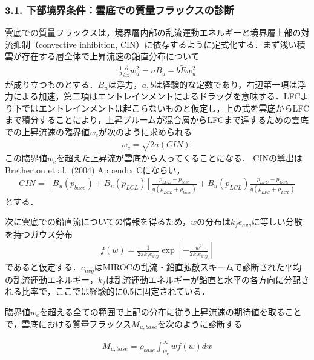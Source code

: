 \hypertarget{ux4e0bux90e8ux5883ux754cux6761ux4ef6ux96f2ux5e95ux3067ux306eux8ceaux91cfux30d5ux30e9ux30c3ux30afux30b9ux306eux8a3aux65ad}{%
\subsubsection{3.1.
下部境界条件：雲底での質量フラックスの診断}\label{ux4e0bux90e8ux5883ux754cux6761ux4ef6ux96f2ux5e95ux3067ux306eux8ceaux91cfux30d5ux30e9ux30c3ux30afux30b9ux306eux8a3aux65ad}}

雲底での質量フラックスは，境界層内部の乱流運動エネルギーと境界層上部の対流抑制（convective
inhibition,
CIN）に依存するように定式化する．まず浅い積雲が存在する層全体で上昇流速の鉛直分布について
\begin{eqnarray}\frac{1}{2}\frac{\partial}{\partial z}w_u^2=aB_u-b\tilde{E} w_u^2\end{eqnarray}
が成り立つものとする．\(B_u\)は浮力，\(a,b\)は経験的な定数であり，右辺第一項は浮力による加速，第二項はエントレインメントによるドラッグを意味する．LFCより下ではエントレインメントは起こらないものと仮定し，上の式を雲底からLFCまで積分することにより，上昇プルームが混合層からLFCまで達するための雲底での上昇流速の臨界値\(w_c\)が次のように求められる
\begin{eqnarray}w_c = \sqrt{2a(CIN)}.\end{eqnarray}
この臨界値\(w_c\)を超えた上昇流が雲底から入ってくることになる．
CINの導出はBretherton et al.~(2004) Appendix Cにならい，
\begin{eqnarray}CIN = [B_u(p_{base}) + B_u(p_{LCL})]\frac{p_{LCL}-p_{base}}{g(\rho_{LCL}+\rho_{base})} + B_u(p_{LCL})\frac{p_{LFC}-p_{LCL}}{g(\rho_{LFC}+\rho_{LCL})}\end{eqnarray}
とする．

次に雲底での鉛直流についての情報を得るため，\(w\)の分布は\(k_f e_{avg}\)に等しい分散を持つガウス分布
\begin{eqnarray}f(w) = \frac{1}{2\pi k_f e_{avg}}\exp\left[ -\frac{w^2}{2k_fe_{avg}}\right]\end{eqnarray}
であると仮定する．\(e_{avg}\)はMIROCの乱流・鉛直拡散スキームで診断された平均の乱流運動エネルギー，\(k_f\)は乱流運動エネルギーが鉛直と水平の各方向に分配される比率で，ここでは経験的に0.5に固定されている．

臨界値\(w_c\)を超える全ての範囲で上記の分布に従う上昇流速の期待値を取ることで，雲底における質量フラックス\(M_{u,base}\)を次のように診断する

\begin{eqnarray}M_{u,base}=\overline{\rho_{base}}\int_{w_c}^{\infty}wf(w)dw\end{eqnarray}


